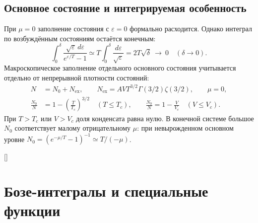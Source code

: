 \documentclass[../final.tex]{subfiles}
\begin{document}
\subsection{Основное состояние и интегрируемая особенность}
При $\mu=0$ заполнение состояния с $\varepsilon=0$ формально расходится.
Однако интеграл по возбуждённым состояниям остаётся конечным:
\begin{equation*}
 \int_0^\delta\frac{\sqrt\varepsilon\,d\varepsilon}{e^{\varepsilon/T}-1}
 \simeq T\int_0^\delta\frac{d\varepsilon}{\sqrt\varepsilon}
 =2T\sqrt\delta\ \longrightarrow\ 0\quad(\delta\to0).
\end{equation*}
Макроскопическое заполнение отдельного основного состояния учитывается
отдельно от непрерывной плотности состояний:
\begin{align*}
 N&=N_0+N_{\mathrm{ex}},\qquad
 N_{\mathrm{ex}}=AVT^{3/2}\Gamma(3/2)\zeta(3/2),\qquad \mu=0,\\
 \frac{N_0}{N}&=1-\left(\frac{T}{T_c}\right)^{3/2}\quad(T\leq T_c),\qquad
 \frac{N_0}{N}=1-\frac{V}{V_c}\quad(V\leq V_c).
\end{align*}
При $T>T_c$ или $V>V_c$ доля конденсата равна нулю.
В конечной системе большое $N_0$ соответствует малому отрицательному
$\mu$: при невырожденном основном уровне
$N_0=(e^{-\mu/T}-1)^{-1}\simeq T/(-\mu)$.

\begin{rbox}[unbreakable,left=18pt,right=18pt,top=14pt,bottom=10pt]{[]}
\centering
\captionsetup{font=footnotesize,hypcap=false,skip=7pt}
\end{rbox}

\clearpage
\section{Бозе-интегралы и специальные функции}
\end{document}

